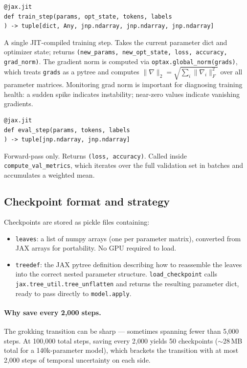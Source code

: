 \documentclass[11pt, a4paper]{article}
\begin{document}
\begin{lstlisting}
@jax.jit
def train_step(params, opt_state, tokens, labels
) -> tuple[dict, Any, jnp.ndarray, jnp.ndarray, jnp.ndarray]
\end{lstlisting}

A single JIT-compiled training step. Takes the current parameter dict and
optimizer state; returns \texttt{(new\_params, new\_opt\_state, loss, accuracy,
grad\_norm)}. The gradient norm is computed via \texttt{optax.global\_norm(grads)},
which treats \texttt{grads} as a pytree and computes
$\|\nabla\|_2 = \sqrt{\sum_i \|\nabla_i\|_F^2}$ over all parameter matrices.
Monitoring grad norm is important for diagnosing training health: a sudden spike
indicates instability; near-zero values indicate vanishing gradients.

\begin{lstlisting}
@jax.jit
def eval_step(params, tokens, labels
) -> tuple[jnp.ndarray, jnp.ndarray]
\end{lstlisting}

Forward-pass only. Returns \texttt{(loss, accuracy)}. Called inside
\texttt{compute\_val\_metrics}, which iterates over the full validation set
in batches and accumulates a weighted mean.

\subsection{Checkpoint format and strategy}

Checkpoints are stored as pickle files containing:
\begin{itemize}[noitemsep]
  \item \texttt{leaves}: a list of numpy arrays (one per parameter matrix),
        converted from JAX arrays for portability. No GPU required to load.
  \item \texttt{treedef}: the JAX pytree definition describing how to
        reassemble the leaves into the correct nested parameter structure.
        \texttt{load\_checkpoint} calls \texttt{jax.tree\_util.tree\_unflatten}
        and returns the resulting parameter dict, ready to pass directly to
        \texttt{model.apply}.
\end{itemize}

\paragraph{Why save every 2{,}000 steps.}
The grokking transition can be sharp --- sometimes spanning fewer than 5{,}000
steps. At 100{,}000 total steps, saving every 2{,}000 yields 50 checkpoints
($\sim$28\,MB total for a 140k-parameter model), which brackets the transition
with at most 2{,}000 steps of temporal uncertainty on each side.
\end{document}
